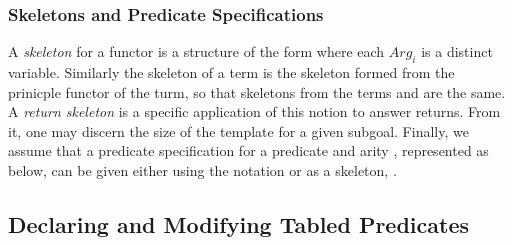 
\subsubsection*{Skeletons and Predicate Specifications}


A \emph{skeleton} for a functor  is a structure of the form
 where each $Arg_i$ is a distinct
variable.  Similarly the skeleton of a term is the skeleton formed
from the prinicple functor of the turm, so that skeletons from the
terms  and  are the same.  A \emph{return
  skeleton} is a specific application of this notion to answer
returns.  From it, one may discern the size of the template for a
given subgoal.  Finally, we assume that a predicate specification for
a predicate  and arity , represented as
 below, can be given either using the notation
 or as a skeleton, .



\subsection{Declaring and Modifying Tabled Predicates}
\label{sec:TablePred:Decl&Mod}

